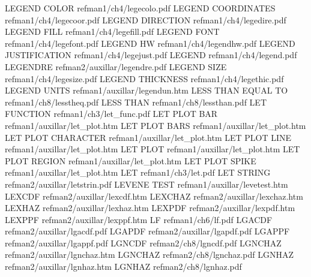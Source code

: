 LEGEND COLOR                            refman1/ch4/legecolo.pdf
LEGEND COORDINATES                      refman1/ch4/legecoor.pdf
LEGEND DIRECTION                        refman1/ch4/legedire.pdf
LEGEND FILL                             refman1/ch4/legefill.pdf
LEGEND FONT                             refman1/ch4/legefont.pdf
LEGEND HW                               refman1/ch4/legendhw.pdf
LEGEND JUSTIFICATION                    refman1/ch4/legejust.pdf
LEGEND                                  refman1/ch4/legend.pdf
LEGENDRE                                refman2/auxillar/legendre.pdf
LEGEND SIZE                             refman1/ch4/legesize.pdf
LEGEND THICKNESS                        refman1/ch4/legethic.pdf
LEGEND UNITS                            refman1/auxillar/legendun.htm
LESS THAN EQUAL TO                      refman1/ch8/lesstheq.pdf
LESS THAN                               refman1/ch8/lessthan.pdf
LET FUNCTION                            refman1/ch3/let_func.pdf
LET PLOT BAR                            refman1/auxillar/let_plot.htm
LET PLOT BARS                           refman1/auxillar/let_plot.htm
LET PLOT CHARACTER                      refman1/auxillar/let_plot.htm
LET PLOT LINE                           refman1/auxillar/let_plot.htm
LET PLOT                                refman1/auxillar/let_plot.htm
LET PLOT REGION                         refman1/auxillar/let_plot.htm
LET PLOT SPIKE                          refman1/auxillar/let_plot.htm
LET                                     refman1/ch3/let.pdf
LET STRING                              refman2/auxillar/letstrin.pdf
LEVENE TEST                             refman1/auxillar/levetest.htm
LEXCDF                                  refman2/auxillar/lexcdf.htm
LEXCHAZ                                 refman2/auxillar/lexchaz.htm
LEXHAZ                                  refman2/auxillar/lexhaz.htm
LEXPDF                                  refman2/auxillar/lexpdf.htm
LEXPPF                                  refman2/auxillar/lexppf.htm
LF                                      refman1/ch6/lf.pdf
LGACDF                                  refman2/auxillar/lgacdf.pdf
LGAPDF                                  refman2/auxillar/lgapdf.pdf
LGAPPF                                  refman2/auxillar/lgappf.pdf
LGNCDF                                  refman2/ch8/lgncdf.pdf
LGNCHAZ                                 refman2/auxillar/lgnchaz.htm
LGNCHAZ                                 refman2/ch8/lgnchaz.pdf
LGNHAZ                                  refman2/auxillar/lgnhaz.htm
LGNHAZ                                  refman2/ch8/lgnhaz.pdf
